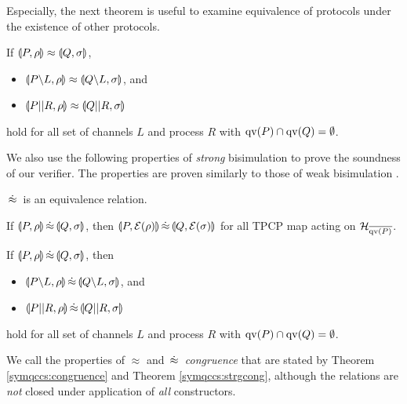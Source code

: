 Especially, the next theorem is useful to examine equivalence of
protocols under the existence of other protocols.
\begin{thm}
\label{symqccs:congruence}
If $\llparenthesis P, \rho \rrparenthesis \approx \llparenthesis Q, \sigma \rrparenthesis$,
\begin{itemize}
 \item $\llparenthesis P \backslash L, \rho \rrparenthesis \approx \llparenthesis Q \backslash L, \sigma \rrparenthesis$,
       and
 \item $\llparenthesis P||R, \rho \rrparenthesis \approx \llparenthesis Q||R, \sigma \rrparenthesis$
\end{itemize}
hold for all set of channels $L$ and process $R$ with
$\mathrm{qv}(P) \cap \mathrm{qv}(Q) = \emptyset$.
\end{thm}

We also use the following properties of {\it strong} bisimulation to
prove the soundness of our verifier. 
The properties are proven
similarly to those of weak bisimulation \cite{DengFeng2012}.
\begin{prop}
\label{symqccs:strgequiv} 
$\,\dot\approx\,$ is an equivalence relation.
\end{prop}

\begin{prop}
\label{symqccs:strgopclose}
 If $\llparenthesis P, \rho \rrparenthesis \,\dot\approx\, \llparenthesis Q, \sigma \rrparenthesis$, then
$\llparenthesis P, \mathcal{E}(\rho) \rrparenthesis \,\dot\approx\, \llparenthesis Q, \mathcal{E}(\sigma) \rrparenthesis$ for all
TPCP map acting on $\mathcal{H}_{\overline{\mathrm{qv}(P)}}$.
\end{prop}
\begin{thm}
\label{symqccs:strgcong}
 If $\llparenthesis P, \rho \rrparenthesis \,\dot\approx\, \llparenthesis Q, \sigma \rrparenthesis$, then
\begin{itemize}
 \item $\llparenthesis P \backslash L, \rho \rrparenthesis \,\dot\approx\, \llparenthesis Q \backslash L, \sigma \rrparenthesis$,
       and
 \item $\llparenthesis P||R, \rho \rrparenthesis \,\dot\approx\, \llparenthesis Q||R, \sigma \rrparenthesis$
\end{itemize}
hold for all set of channels $L$ and process $R$ with
$\mathrm{qv}(P) \cap \mathrm{qv}(Q) = \emptyset$.
\end{thm}

We call the properties of $\approx$ and $\,\dot\approx\,$ {\it congruence}
that are stated by Theorem \ref{symqccs:congruence} and Theorem
\ref{symqccs:strgcong}, although the relations are {\it not} closed
under application of {\it all} constructors.

